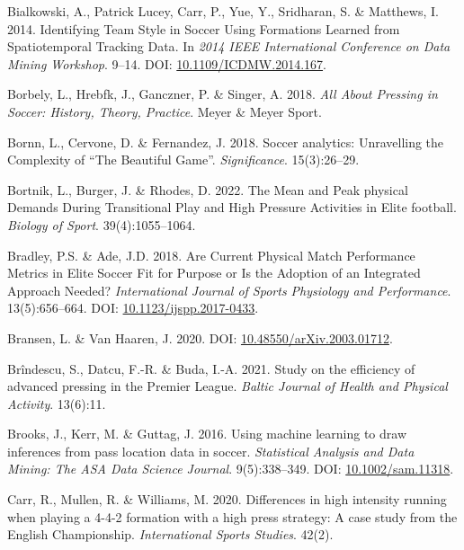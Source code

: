\documentclass[
  a4paper,
  twoside]{uoe-thesis-template}
\newlength{\cslhangindent}
\newenvironment{CSLReferences}[2] %
 {\begin{list}{}{%
  \setlength{\itemindent}{0pt}
  \setlength{\leftmargin}{0pt}
  \setlength{\parsep}{0pt}
  \ifodd #1
   \setlength{\leftmargin}{\cslhangindent}
   \setlength{\itemindent}{-1\cslhangindent}
  \fi
  \setlength{\itemsep}{#2\baselineskip}}}
 {\end{list}}
\begin{document}
\begin{CSLReferences}{0}{0}
Bialkowski, A., Patrick Lucey, Carr, P., Yue, Y., Sridharan, S. \&
Matthews, I. 2014. Identifying {Team} {Style} in {Soccer} {Using}
{Formations} {Learned} from {Spatiotemporal} {Tracking} {Data}. In
\emph{2014 {IEEE} {International} {Conference} on {Data} {Mining}
{Workshop}}. 9--14. DOI:
\href{https://doi.org/10.1109/ICDMW.2014.167}{10.1109/ICDMW.2014.167}.

Borbely, L., Hrebfk, J., Ganczner, P. \& Singer, A. 2018. \emph{All
{About} {Pressing} in {Soccer}: {History}, {Theory}, {Practice}}. Meyer
\& Meyer Sport.

Bornn, L., Cervone, D. \& Fernandez, J. 2018. Soccer analytics:
{Unravelling} the {Complexity} of {``{The} {Beautiful} {Game}''}.
\emph{Significance}. 15(3):26--29.

Bortnik, L., Burger, J. \& Rhodes, D. 2022. The {Mean} and {Peak}
physical {Demands} {During} {Transitional} {Play} and {High} {Pressure}
{Activities} in {Elite} football. \emph{Biology of Sport}.
39(4):1055--1064.

Bradley, P.S. \& Ade, J.D. 2018. Are {Current} {Physical} {Match}
{Performance} {Metrics} in {Elite} {Soccer} {Fit} for {Purpose} or {Is}
the {Adoption} of an {Integrated} {Approach} {Needed}?
\emph{International Journal of Sports Physiology and Performance}.
13(5):656--664. DOI:
\href{https://doi.org/10.1123/ijspp.2017-0433}{10.1123/ijspp.2017-0433}.

Bransen, L. \& Van Haaren, J. 2020. DOI:
\href{https://doi.org/10.48550/arXiv.2003.01712}{10.48550/arXiv.2003.01712}.

Brîndescu, S., Datcu, F.-R. \& Buda, I.-A. 2021. Study on the efficiency
of advanced pressing in the {Premier} {League}. \emph{Baltic Journal of
Health and Physical Activity}. 13(6):11.

Brooks, J., Kerr, M. \& Guttag, J. 2016. Using machine learning to draw
inferences from pass location data in soccer. \emph{Statistical Analysis
and Data Mining: The ASA Data Science Journal}. 9(5):338--349. DOI:
\href{https://doi.org/10.1002/sam.11318}{10.1002/sam.11318}.

Carr, R., Mullen, R. \& Williams, M. 2020. Differences in high intensity
running when playing a 4-4-2 formation with a high press strategy: A
case study from the {English} {Championship}. \emph{International Sports
Studies}. 42(2).


\end{CSLReferences}
\end{document}
